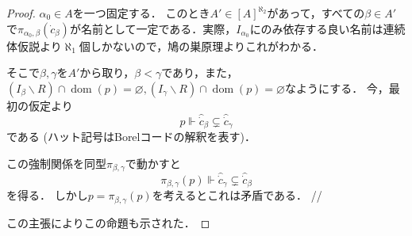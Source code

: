 \documentclass[uplatex,dvipdfmx]{jsarticle}
\newcommand{\dom}{\operatorname{dom}}
\newcommand\forces{\Vdash}
\renewcommand\emptyset{\varnothing}
\renewcommand{\setminus}{\smallsetminus}
\theoremstyle{definition}
\begin{document}
\begin{proof}
		$\alpha_0 \in A$を一つ固定する．
		このとき$A' \in [A]^{\aleph_2}$があって，すべての$\beta \in A'$で$\pi_{\alpha_0,\beta}(\dot{c}_\beta)$が名前として一定である．実際，$I_{\alpha_0}$にのみ依存する良い名前は連続体仮説より$\aleph_1$個しかないので，鳩の巣原理よりこれがわかる．
		
		そこで$\beta, \gamma$を$A'$から取り，$\beta < \gamma$であり，また，$(I_\beta \setminus R) \cap \dom(p) = \emptyset, (I_\gamma \setminus R) \cap \dom(p) = \emptyset$なようにする．
		今，最初の仮定より
		\[
		p \forces \hat{\dot{c}}_\beta \subsetneq \hat{\dot{c}}_\gamma
		\]
		である (ハット記号はBorelコードの解釈を表す)．
		
		この強制関係を同型$\pi_{\beta,\gamma}$で動かすと
		\[
		\pi_{\beta,\gamma}(p) \forces \hat{\dot{c}}_\gamma \subsetneq \hat{\dot{c}}_\beta
		\]
		を得る．
		しかし$p = \pi_{\beta,\gamma}(p)$を考えるとこれは矛盾である． \hfill //
		
		この主張によりこの命題も示された．
	\end{proof}
	
	\nocite{*}
	\printbibliography[title={参考文献}]
\end{document}
